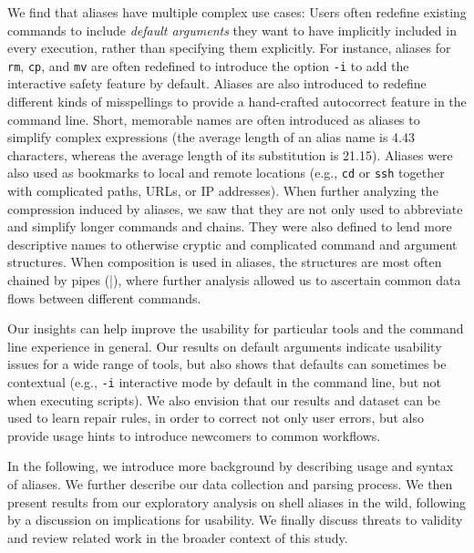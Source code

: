 We find that aliases have multiple complex use cases:
Users often redefine existing commands to include \emph{default arguments} they want to have implicitly included in every execution, rather than specifying them explicitly.
For instance, aliases for \verb|rm|, \verb|cp|, and \verb|mv| are often redefined to introduce the option \verb|-i| to add the interactive safety feature by default.
Aliases are also introduced to redefine different kinds of misspellings to provide a hand-crafted autocorrect feature in the command line. 
Short, memorable names are often introduced as aliases to simplify complex expressions (the average length of an alias name is 4.43 characters, whereas the average length of its substitution is 21.15).
Aliases were also used as bookmarks to local and remote locations (e.g., \verb|cd| or \verb|ssh| together with complicated paths, URLs, or IP addresses).
When further analyzing the compression induced by aliases, we saw that they are not only used to abbreviate and simplify longer commands and chains.
They were also defined to lend more descriptive names to otherwise cryptic and complicated command and argument structures.
When composition is used in aliases, the structures are most often chained by pipes (\verb|||), where further analysis allowed us to ascertain common data flows between different commands.

Our insights can help improve the usability for particular tools and the command line experience in general.
Our results on default arguments indicate usability issues for a wide range of tools, but also shows that defaults can sometimes be contextual (e.g., \verb|-i| interactive mode by default in the command line, but not when executing scripts).
We also envision that our results and dataset can be used to learn repair rules, in order to correct not only user errors, but also provide usage hints to introduce newcomers to common workflows.

In the following, we introduce more background by describing usage and syntax of aliases. We further describe our data collection and parsing process. We then present results from our exploratory analysis on shell aliases in the wild, following by a discussion on implications for usability. We finally discuss threats to validity and review related work in the broader context of this study. 
